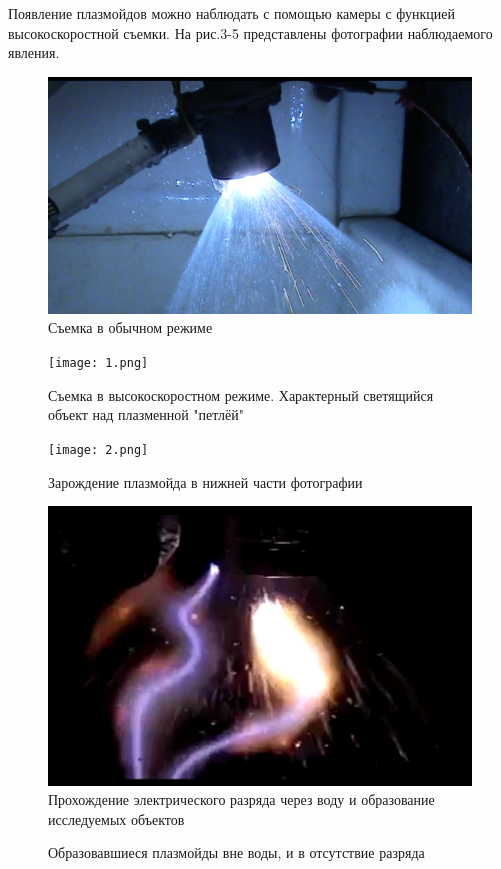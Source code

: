 \documentclass[a4paper]{article}
\begin{document}
Появление плазмойдов можно наблюдать с помощью камеры с функцией высокоскоростной съемки. На рис.3-5 представлены фотографии наблюдаемого явления. 

\begin{figure}[h]
    \includegraphics{forsun_p_1.png}    
    \centering
    \caption{Съемка в обычном режиме}
\end{figure}
\begin{figure}[h]
    \texttt{[image: 1.png]}    
    \centering
    \caption{Съемка в высокоскоростном режиме. Характерный светящийся объект над плазменной "петлёй"}
\end{figure}
\begin{figure}[h]
    \texttt{[image: 2.png]}    
    \centering
    \caption{Зарождение плазмойда в нижней части фотографии}
\end{figure}
\begin{figure}[h!]
    \includegraphics[width=0.55\linewidth]{Screen1.png}
    \centering
    \caption{Прохождение электрического разряда через воду и образование исследуемых объектов}
\end{figure}
\begin{figure}[h!]
    \caption{Образовавшиеся плазмойды вне воды, и в отсутствие разряда}
\end{figure}
\end{document}
